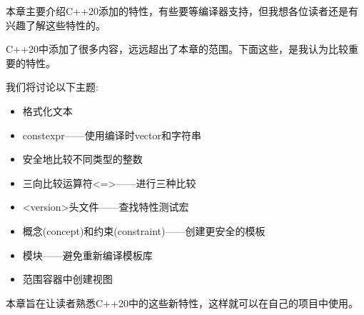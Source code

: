 
本章主要介绍C++20添加的特性，有些要等编译器支持，但我想各位读者还是有兴趣了解这些特性的。

C++20中添加了很多内容，远远超出了本章的范围。下面这些，是我认为比较重要的特性。

我们将讨论以下主题:

\begin{itemize}
\item 
格式化文本

\item 
constexpr——使用编译时vector和字符串

\item 
安全地比较不同类型的整数

\item 
三向比较运算符<=>——进行三种比较

\item 
<version>头文件——查找特性测试宏

\item 
概念(concept)和约束(constraint)——创建更安全的模板

\item 
模块——避免重新编译模板库

\item 
范围容器中创建视图
\end{itemize}

本章旨在让读者熟悉C++20中的这些新特性，这样就可以在自己的项目中使用。


